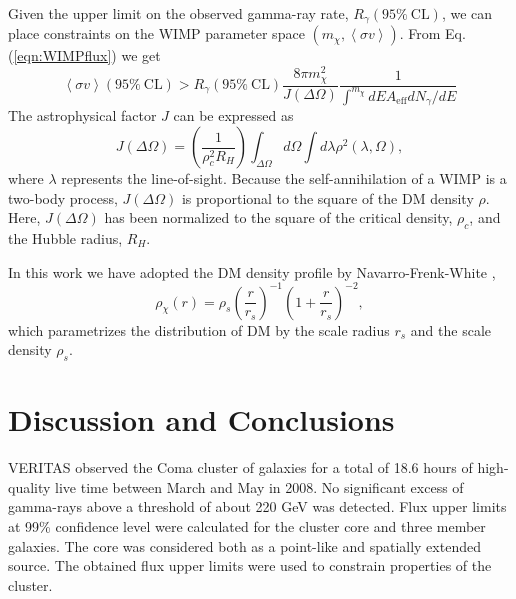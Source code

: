 \documentclass[12pt,manuscript]{aastex}
\newcommand{\expval}[1]{\left\langle #1 \right\rangle}
\begin{document}
Given the upper limit on the observed gamma-ray rate, $R_{\gamma}(95\%\ \mathrm{CL})$, we can place
constraints on the WIMP parameter space $(m_{\chi}, \expval{\sigma v})$. From Eq.
(\ref{eqn:WIMPflux}) we get
\begin{equation}
\expval{\sigma v}(95\%\ \mathrm{CL}) > 
R_{\gamma}(95\%\ \mathrm{CL}) \frac{8\pi m_{\chi}^{2}}{J(\Delta\Omega)}
\frac{1}{\int^{m_{\chi}} dE A_{\mathrm{eff}}dN_{\gamma}/dE}
\end{equation}
The astrophysical factor $J$ can be expressed as
\begin{equation}
J(\Delta\Omega)=\left(\frac{1}{\rho_{c}^{2}R_{H}}\right)
\int_{\Delta\Omega}d\Omega\int d\lambda \rho^{2}(\lambda,\Omega),
\end{equation}
where $\lambda$ represents the line-of-sight. Because the self-annihilation of a WIMP is a two-body
process, $J(\Delta\Omega)$ is proportional to the square of the DM density $\rho$. Here,
$J(\Delta\Omega)$ has been normalized to the square of the critical density, $\rho_{c}$, and the
Hubble radius, $R_{H}$. 

In this work we have adopted the DM density profile by Navarro-Frenk-White
\citep[NFW;][]{article:NavarroFrenkWhite:1997},
\begin{equation}
\rho_{\chi}(r)=\rho_{s}\left(\frac{r}{r_{s}}\right)^{-1}\left(1+\frac{r}{r_{s}}\right)^{-2},
\end{equation} 
which parametrizes the distribution of DM by the scale radius $r_{s}$ and the scale density
$\rho_{s}$.  


%
%

\section{Discussion and Conclusions}
VERITAS observed the Coma cluster of galaxies for a total of 18.6 hours of high-quality live time
between March and May in 2008. No significant excess of gamma-rays above a threshold of about 220
GeV was detected. Flux upper limits at 99\% confidence level were calculated for the cluster core
and three member galaxies. The core was considered both as a point-like and spatially extended
source. The obtained flux upper limits were used to constrain properties of the cluster.
\end{document}
